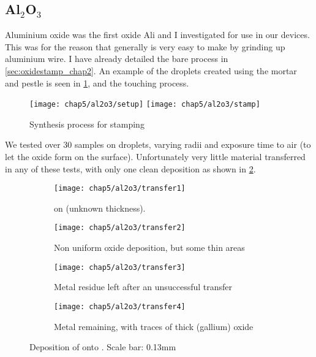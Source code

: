 \documentclass[../Matt_Gebert_Honours_Thesis.tex]{subfiles}
\begin{document}
	\subsection{Al$_2$O$_3$}
		Aluminium oxide was the first oxide Ali and I investigated for use in our devices. This was for the reason that generally \aluminimumoxide{} is very easy to make by grinding up aluminium wire. I have already detailed the bare process in \cref{sec:oxidestamp_chap2}. An example of the droplets created using the mortar and pestle is seen in \cref{fig:al_synthesis}, and the touching process.		
		\begin{figure}[H]
			\centering
			\texttt{[image: chap5/al2o3/setup]}
			\texttt{[image: chap5/al2o3/stamp]}
			\caption[\aluminimumoxide{} synthesis process]{Synthesis process for stamping \aluminimumoxide{} }\label{fig:al_synthesis}
		\end{figure}
		We tested over 30 samples on droplets, varying radii and exposure time to air (to let the oxide form on the surface). Unfortunately very little material transferred in any of these tests, with only one clean deposition as shown in \cref{fig:al2o3_1}. 
		\begin{figure}[H]
			\begin{subfigure}[t]{0.5\textwidth}
				\centering
				\texttt{[image: chap5/al2o3/transfer1]}
				\caption{\aluminimumoxide{} on \silicondioxide{} (unknown thickness).}\label{fig:al2o3_1}
			\end{subfigure}
			\begin{subfigure}[t]{0.5\textwidth}
				\centering
				\texttt{[image: chap5/al2o3/transfer2]}
				\caption{Non uniform oxide deposition, but some thin areas}\label{fig:al2o3_2}
			\end{subfigure}
			\begin{subfigure}[t]{0.5\textwidth}
				\centering
				\texttt{[image: chap5/al2o3/transfer3]}
				\caption{Metal residue left after an unsuccessful transfer}\label{fig:al2o3_3}
			\end{subfigure}
			\begin{subfigure}[t]{0.5\textwidth}
				\centering
				\texttt{[image: chap5/al2o3/transfer4]}
				\caption{Metal remaining, with traces of thick (gallium) oxide}\label{fig:al2o3_4}
			\end{subfigure}
		\caption[\aluminimumoxide{} stamped on \silicondioxide{}]{Deposition of \aluminimumoxide{} onto \silicondioxide{}. Scale bar: 0.13mm}\label{fig:transfer_al_on_si}
		\end{figure}
\end{document}
